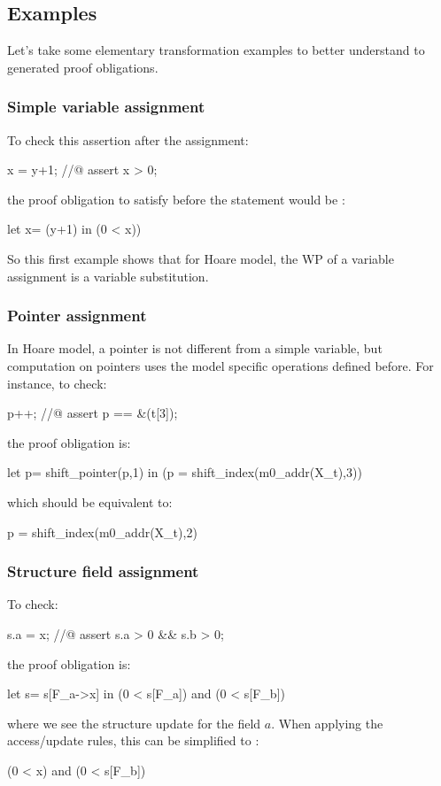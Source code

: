 \subsection{Examples}

Let's take some elementary transformation examples to better understand to
generated proof obligations.

\subsubsection{Simple variable assignment}

To check this assertion after the assignment:
\begin{ccode}
  x = y+1;
  //@ assert x > 0;
\end{ccode}
the proof obligation to satisfy before the statement would be :
\begin{whycode}
  let x= (y+1) in (0 < x))
\end{whycode}
So this first example shows that for Hoare model, 
the WP of a variable assignment is a variable substitution. 

\subsubsection{Pointer assignment}

In Hoare model, a pointer is not different from a simple variable,
but computation on pointers uses the model specific operations defined before.
For instance, to check:
\begin{ccode}
  p++;
  //@ assert p == &(t[3]);
\end{ccode}
the proof obligation is: 
\begin{whycode}
let p= shift_pointer(p,1) in (p = shift_index(m0_addr(X_t),3))
\end{whycode}
which should be equivalent to:
\begin{whycode}
p = shift_index(m0_addr(X_t),2)
\end{whycode}


\subsubsection{Structure field assignment}

To check:
\begin{ccode}
  s.a = x;
  //@ assert s.a > 0 && s.b > 0;
\end{ccode}
the proof obligation is:
\begin{whycode}
  let s= s[F_a->{x}] in (0 < {s[F_a]}) and (0 < {s[F_b]})
\end{whycode}
where we see the structure update for the field $a$.
When applying the access/update rules, this can be simplified to :
\begin{whycode}
  (0 < x) and (0 < {s[F_b]})
\end{whycode}

